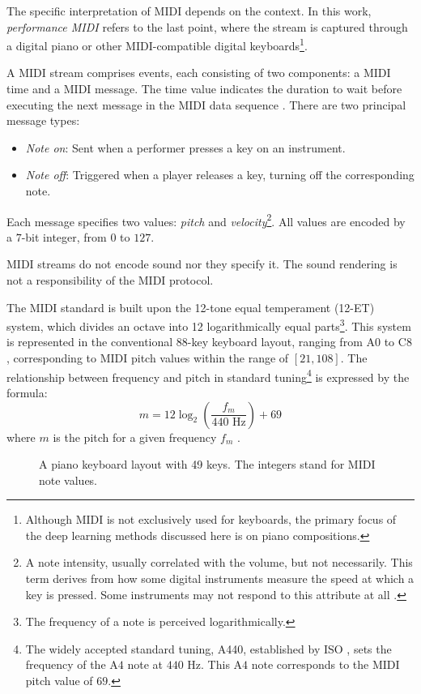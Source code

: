 The specific interpretation of MIDI depends on the context. In this work, \emph{performance MIDI} refers to the last point, where the stream is captured through a digital piano or other MIDI-compatible digital keyboards\footnote{Although MIDI is not exclusively used for keyboards, the primary focus of the deep learning methods discussed here is on piano compositions.}.

A MIDI stream comprises events, each consisting of two components: a MIDI time and a MIDI message. The time value indicates the duration to wait before executing the next message in the MIDI data sequence \cite[p.~3]{Oliveira2017}. There are two principal message types:
\begin{itemize}
\item \emph{Note on}: Sent when a performer presses a key on an instrument.
\item \emph{Note off}: Triggered when a player releases a key, turning off the corresponding note.
\end{itemize}

Each message specifies two values: \emph{pitch} and \emph{velocity}\footnote{A note intensity, usually correlated with the volume, but not necessarily. This term derives from how some digital instruments measure the speed at which a key is pressed. Some instruments may not respond to this attribute at all \cite[p.~22]{Huber2007}.}. All values are encoded by a $7$-bit integer, from $0$ to $127$.

MIDI streams do not encode sound nor they specify it. The sound rendering is not a responsibility of the MIDI protocol.

The MIDI standard is built upon the 12-tone equal temperament (12-ET) system, which divides an octave into 12 logarithmically equal parts\footnote{The frequency of a note is perceived logarithmically.}. This system is represented in the conventional 88-key keyboard layout, ranging from $\textrm{A}0$ to $\textrm{C}8$, corresponding to MIDI pitch values within the range of $[21, 108]$. The relationship between frequency and pitch in standard tuning\footnote{The widely accepted standard tuning, A440, established by ISO \cite{ISO1975}, sets the frequency of the $\textrm{A}4$ note at $440$ Hz. This $\textrm{A}4$ note corresponds to the MIDI pitch value of $69$.} is expressed by the formula: $$m = 12 \log_2\left(\frac{f_m}{440\textrm{ Hz}}\right) + 69$$ where $m$ is the pitch for a given frequency $f_m$ \cite[p.~47--48]{MIDI1996}.

\begin{figure}[ht!]
\centering
\resizebox{1.0\linewidth}{!}{

}
\caption[A piano keyboard layout with 49 keys.]{A piano keyboard layout with 49 keys. The integers stand for MIDI note values.}
\end{figure}

